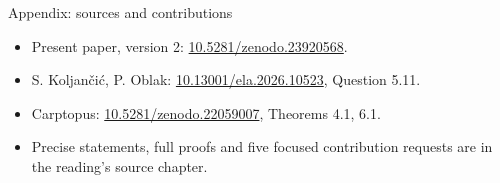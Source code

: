 \documentclass{beamer}
\begin{document}
\begin{frame}{Appendix: sources and contributions}
\small
\begin{itemize}
\item Present paper, version 2: \href{https://doi.org/10.5281/zenodo.23920568}{10.5281/zenodo.23920568}.
\item S. Koljančić, P. Oblak: \href{https://doi.org/10.13001/ela.2026.10523}{10.13001/ela.2026.10523}, Question 5.11.
\item Carptopus: \href{https://doi.org/10.5281/zenodo.22059007}{10.5281/zenodo.22059007}, Theorems 4.1, 6.1.
\item Precise statements, full proofs and five focused contribution requests are in the reading's source chapter.
\end{itemize}
\PinnedCommit
{}
\end{frame}

\FormalVerification
\end{document}

